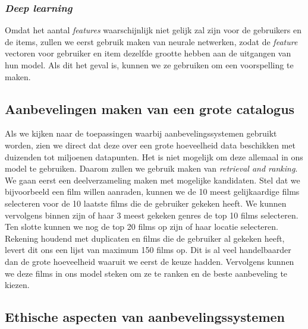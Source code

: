 \subsubsection{\textit{Deep learning}}

Omdat het aantal \textit{features} waarschijnlijk niet gelijk zal  zijn voor de gebruikers en de items, zullen we eerst gebruik maken van neurale netwerken, zodat de \textit{feature} vectoren voor gebruiker en item dezelfde grootte hebben aan de uitgangen van hun model. Als dit het geval is, kunnen we ze gebruiken om een voorspelling te maken.

\subsection{Aanbevelingen maken van een grote catalogus}

Als we kijken naar de toepassingen waarbij aanbevelingssystemen gebruikt worden, zien we direct dat deze over een grote hoeveelheid data beschikken met duizenden tot miljoenen datapunten. Het is niet mogelijk om deze allemaal in ons model te gebruiken. Daarom zullen we gebruik maken van \textit{retrieval and ranking}.\\
\newline
We gaan eerst een deelverzameling maken met mogelijke kandidaten. Stel dat we bijvoorbeeld een film willen aanraden, kunnen we de 10 meest gelijkaardige films selecteren voor de 10 laatste films die de gebruiker gekeken heeft. We kunnen vervolgens binnen zijn of haar 3 meest gekeken genres de top 10 films selecteren. Ten slotte kunnen we nog de top 20 films op zijn of haar locatie selecteren. Rekening houdend met duplicaten en films die de gebruiker al gekeken heeft, levert dit ons een lijst van maximum 150 films op. Dit is al veel handelbaarder dan de grote hoeveelheid waaruit we eerst de keuze hadden. Vervolgens kunnen we deze films in ons model steken om ze te ranken en de beste aanbeveling te kiezen.

\subsection{Ethische aspecten  van aanbevelingssystemen}

